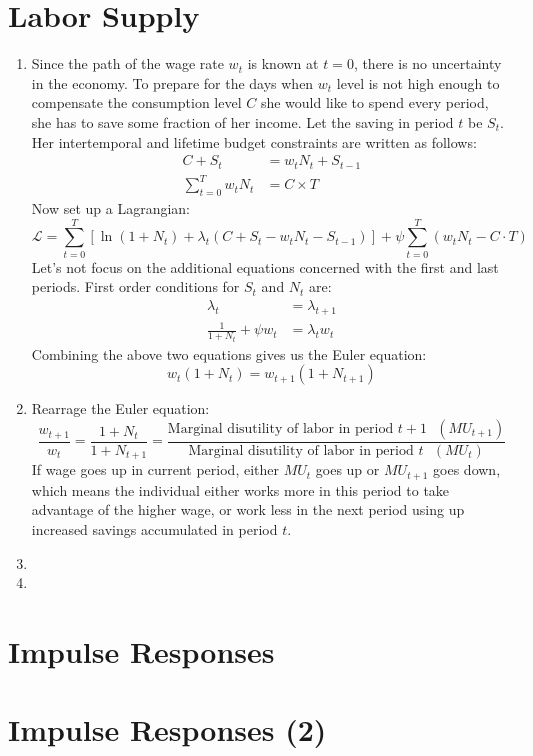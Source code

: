 \documentclass[11pt]{amsart}
\begin{document}
\section{Labor Supply}
\begin{enumerate}[label=(\alph*)]
	\item Since the path of the wage rate $w_t$ is known at $t=0$, there is no uncertainty in the economy. To prepare for the days when $w_t$ level is not high enough to compensate the consumption level $C$ she would like to spend every period, she has to save some fraction of her income. Let the saving in period $t$ be $S_t$. Her intertemporal and lifetime budget constraints are written as follows: 
	\begin{align*}
	C + S_t &= w_t N_t + S_{t-1} \\
	\sum_{t=0}^{T} w_t N_t & = C \times T
	\end{align*} Now set up a Lagrangian: 
	\begin{equation*}
	\mathcal{L} = \sum_{t=0}^{T}  \left[ \ln (1+ N_t) + \lambda_t \left(C + S_t - w_t N_t - S_{t-1} \right) \right] + \psi \sum_{t=0}^{T} \left( w_t N_t - C \cdot T\right)  
	\end{equation*}
    Let's not focus on the additional equations concerned with the first and last periods. First order conditions for $S_t$ and $N_t$ are: 
    \begin{align*}
    \lambda_t &= \lambda_{t+1} \\
    \frac{1}{1+N_t} + \psi w_t &= \lambda_t w_t 
    \end{align*}
    Combining the above two equations gives us the Euler equation: 
    \begin{equation*}
    w_t (1+ N_t) = w_{t+1} (1+N_{t+1})
    \end{equation*}
    \item Rearrage the Euler equation: 
    \begin{equation*}
    \frac{w_{t+1}}{w_t} = \frac{1+N_t}{1+ N_{t+1}} = \frac{\text{Marginal disutility of labor in period $t+1$ } (MU_{t+1}) }{\text{Marginal disutility of labor in period $t$ } (MU_t) }
    \end{equation*}
    If wage goes up in current period, either $MU_t$ goes up or $MU_{t+1}$ goes down, which means the individual either works more in this period to take advantage of the higher wage, or work less in the next period using up increased savings accumulated in period $t$. 
    
    \item 
    \item 
\end{enumerate}
\section{Impulse Responses}
\section{Impulse Responses (2)}
\end{document}
